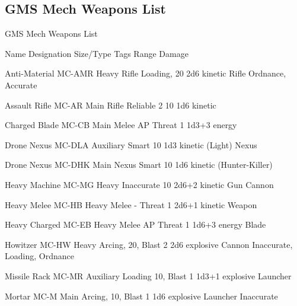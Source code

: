 \subsection{GMS Mech Weapons List}
                                   GMS Mech Weapons List

Name                 Designation        Size/Type        Tags                Range          Damage

Anti-Material        MC-AMR             Heavy Rifle       Loading,            20            2d6 kinetic
Rifle                                                     Ordnance,
                                                        Accurate

Assault Rifle         MC-AR              Main Rifle        Reliable 2          10             1d6 kinetic

Charged Blade        MC-CB              Main Melee      AP                  Threat 1        1d3+3 energy

Drone Nexus          MC-DLA             Auxiliary        Smart               10             1d3 kinetic
(Light)                                 Nexus

Drone Nexus          MC-DHK             Main Nexus       Smart               10             1d6 kinetic
(Hunter-Killer)

Heavy Machine        MC-MG              Heavy            Inaccurate          10            2d6+2 kinetic
Gun                                     Cannon

Heavy Melee          MC-HB              Heavy Melee      -                  Threat 1       2d6+1 kinetic
Weapon

Heavy Charged        MC-EB              Heavy Melee     AP                  Threat 1        1d6+3 energy
Blade

Howitzer             MC-HW              Heavy           Arcing,              20, Blast 2   2d6 explosive
                                        Cannon           Inaccurate,
                                                         Loading,
                                                         Ordnance

Missile Rack         MC-MR              Auxiliary        Loading             10, Blast 1    1d3+1 explosive
                                        Launcher

Mortar               MC-M               Main            Arcing,              10, Blast 1    1d6 explosive
                                        Launcher         Inaccurate

